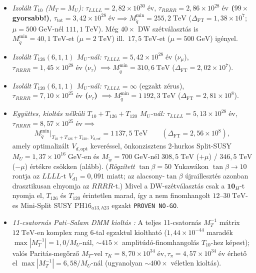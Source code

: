 \documentclass[11pt,a4paper]{article}
\begin{document}
\begin{enumerate}
\begin{itemize}
        \item \emph{Izolált $T_{10}$ ($M_T = M_U$):} $\tau_{LLLL} = 2{,}82\times 10^{30}\;\text{év}$, \textbf{$\tau_{RRRR} = 2{,}86\times 10^{28}\;\text{év}$ ($99\times$ gyorsabb!)}, $\tau_{\mathrm{tot}} = 3{,}42\times 10^{28}\;\text{év} \implies M_{\tilde q}^{\min} = 255{,}2\;\mathrm{TeV}$ ($\Delta_{\mathrm{FT}} = 1{,}38\times 10^7$; $\mu = 500\;\mathrm{GeV}$-nél $111{,}1\;\mathrm{TeV}$). Még $40\times$ DW szétválasztás is $M_{\tilde q}^{\min} = 40{,}1\;\mathrm{TeV}$-et ($\mu=2\;\mathrm{TeV}$) ill.\ $17{,}5\;\mathrm{TeV}$-et ($\mu=500\;\mathrm{GeV}$) igényel.
        \item \emph{Izolált $T_{126}(6,1,1)$ $M_U$-nál:} $\tau_{LLLL} = 5{,}42\times 10^{28}\;\text{év}$ ($\nu_\mu$), $\tau_{RRRR} = 1{,}45\times 10^{28}\;\text{év}$ ($\nu_\tau$) $\implies M_{\tilde q}^{\min} = 310{,}6\;\mathrm{TeV}$ ($\Delta_{\mathrm{FT}} = 2{,}02\times 10^7$).
        \item \emph{Izolált $T_{120}(6,1,1)$ $M_U$-nál:} $\tau_{LLLL} = \infty$ (egzakt zérus), \textbf{$\tau_{RRRR} = 7{,}10\times 10^{25}\;\text{év}$ ($\nu_\tau$)} $\implies M_{\tilde q}^{\min} = 1\,192{,}3\;\mathrm{TeV}$ ($\Delta_{\mathrm{FT}} = 2{,}81\times 10^8$).
        \item \emph{Együttes, kioltás nélküli $T_{10} + T_{126} + T_{120}$ $M_U$-nál:} $\tau_{LLLL} = 5{,}13\times 10^{28}\;\text{év}$, $\tau_{RRRR} = 8{,}57\times 10^{25}\;\text{év} \implies$
        \begin{equation}
            M_{\tilde q}^{\min}\big|_{T_{10}+T_{126}+T_{120},\,V_{d,\mathrm{ref}}} = 1\,137{,}5\;\mathrm{TeV} \qquad (\Delta_{\mathrm{FT}} = 2{,}56\times 10^8),
            \label{eq:d5-nogo-hu}
        \end{equation}
        amely optimalizált $V_{d,\mathrm{opt}}$ keveréssel, önkonzisztens 2-hurkos Split-SUSY $M_U=1{,}37\times 10^{16}\;\mathrm{GeV}$-en és $M_{\tilde w}=700\;\mathrm{GeV}$-nél $308{,}5\;\mathrm{TeV}$ ($+\mu$) / $346{,}5\;\mathrm{TeV}$ ($-\mu$) értékre csökken (alább). (\emph{Rögzített} $\tan\beta=50$ Yukawákon $\tan\beta\to 10$ rontja az $LLLL$-t $V_{d1}=0{,}091$ miatt; az alacsony-$\tan\beta$ újraillesztés azonban drasztikusan elnyomja az $RRRR$-t.) Mivel a DW-szétválasztás csak a $\mathbf{10}_H$-t nyomja el, $T_{126}$ és $T_{120}$ érintetlen marad, így a nem finomhangolt $12\text{--}30\;\mathrm{TeV}$-es Mini-Split SUSY $\mathrm{PH16}_{a13,h23}$ egzakt \texttt{PROVEN NO-GO}.
        \item \emph{11-csatornás Pati--Salam DMM kioltás \cite{Dutta2005}:} A teljes 11-csatornás $M_T^{-1}$ mátrix $12\;\mathrm{TeV}$-en komplex rang 6-tal egzaktul kioltható ($1{,}44\times 10^{-44}$ maradék $\max|M_T^{-1}|=1{,}0/M_U$-nál, $\sim 415\times$ amplitúdó-finomhangolás $T_{10}$-hez képest); valós Paritás-megőrző $M_T$-vel $\tau_K = 8{,}70\times 10^{34}\;\text{év}, \tau_\pi = 4{,}57\times 10^{34}\;\text{év}$ érhető el $\max|M_T^{-1}| = 6{,}58/M_U$-nál (ugyanolyan $\sim 400\times$ véletlen kioltás).

\end{itemize}
\end{enumerate}
\end{document}
